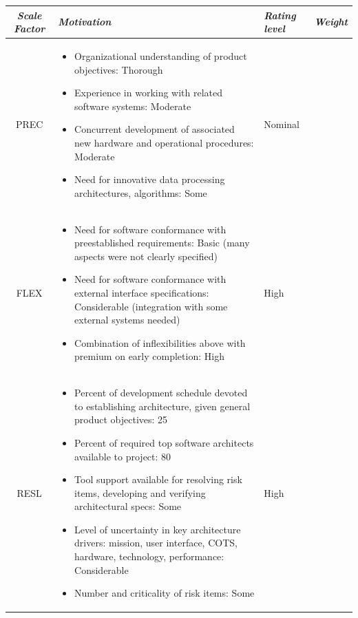 \noindent \begin{center}
\begin{tabular}{c|>{\raggedright}p{8.5cm}|>{\centering}p{1.5cm}|>{\centering}p{1.5cm}}
\hline 
\emph{Scale Factor} & \emph{Motivation} & \emph{Rating level} & \emph{Weight}\tabularnewline
\hline 
\hline 
PREC  & \begin{itemize}
\item {\small{}Organizational understanding of product objectives: Thorough}{\small \par}
\item {\small{}Experience in working with related software systems: Moderate}{\small \par}
\item {\small{}Concurrent development of associated new hardware and operational
procedures: Moderate}{\small \par}
\item {\small{}Need for innovative data processing architectures, algorithms:
Some}\end{itemize}
 & Nominal & 3.72\tabularnewline
\hline 
FLEX  & \begin{itemize}
\item {\small{}Need for software conformance with preestablished requirements:
Basic (many aspects were not clearly specified)}{\small \par}
\item {\small{}Need for software conformance with external interface specifications:
Considerable (integration with some external systems needed)}{\small \par}
\item {\small{}Combination of inflexibilities above with premium on early
completion: High}\end{itemize}
 & High & 2.03\tabularnewline
\hline 
RESL & \begin{itemize}
\item {\small{}Percent of development schedule devoted to establishing architecture,
given general product objectives: 25}{\small \par}
\item {\small{}Percent of required top software architects available to
project: 80}{\small \par}
\item {\small{}Tool support available for resolving risk items, developing
and verifying architectural specs: Some}{\small \par}
\item {\small{}Level of uncertainty in key architecture drivers: mission,
user interface, COTS, hardware, technology, performance: Considerable}{\small \par}
\item {\small{}Number and criticality of risk items: Some}\end{itemize}
 & High & 2.83\tabularnewline
\hline 
\end{tabular}
\par\end{center}

